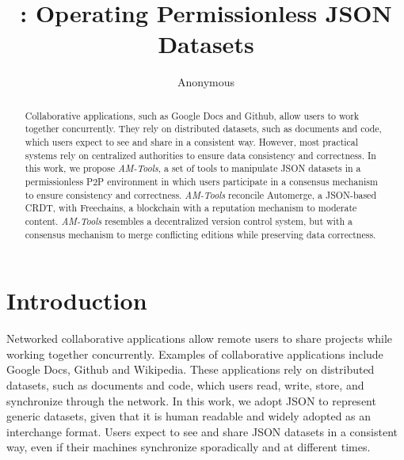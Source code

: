 \documentclass[12pt]{article}
\title{
    \AMT: Operating Permissionless JSON Datasets
}
\author{Anonymous}
\newcommand{\AMT}      {\emph{AM-Tools}\xspace}
\begin{document}

\maketitle

\begin{abstract}
Collaborative applications, such as Google Docs and Github, allow users to work
together concurrently.
They rely on distributed datasets, such as documents and code, which users
expect to see and share in a consistent way.
However, most practical systems rely on centralized authorities to ensure data
consistency and correctness.
%
In this work, we propose \AMT, a set of tools to manipulate JSON datasets in a
permissionless P2P environment in which users participate in a consensus
mechanism to ensure consistency and correctness.
%
\AMT reconcile Automerge, a JSON-based CRDT, with Freechains, a blockchain with
a reputation mechanism to moderate content.
%
\AMT resembles a decentralized version control system, but with a consensus
mechanism to merge conflicting editions while preserving data correctness.
\end{abstract}

\section{Introduction}
\label{sec.introduction}

Networked collaborative applications allow remote users to share projects while
working together concurrently.
Examples of collaborative applications include Google Docs, Github and
Wikipedia.
%
These applications rely on distributed datasets, such as documents and code,
which users read, write, store, and synchronize through the network.
In this work, we adopt JSON to represent generic datasets, given that it is
human readable and widely adopted as an interchange format.
Users expect to see and share JSON datasets in a consistent way, even if their
machines synchronize sporadically and at different times.
\end{document}
